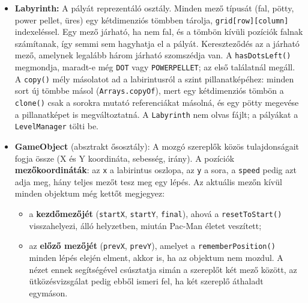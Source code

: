 \documentclass[11pt, a4paper]{article}
\begin{document}
\begin{itemize}
    \textbf{Mentés és betöltés:} A \texttt{saveGameState(file)} metódus fájlba írja ezt a motort, a \texttt{loadGameState(file)} metódus pedig \textbf{statikus gyártómetódus} (static factory): egy vadonatúj, a fájlból beolvasott \texttt{GameEngine}-t ad vissza, ahelyett hogy egy meglévőt töltene fel, mert a legtöbb adattag (\texttt{map}, \texttt{pacman}, \texttt{ghosts}, \texttt{random}, \ldots) \texttt{final}, és a létrehozás után nem kaphat új értéket. Ugyanez az elv, mint amikor a \texttt{LevelManager} \texttt{loadFromCSV} metódusa új \texttt{LevelData}-t ad vissza. Lásd: \ref{sec:io}.~fejezet.
    \item \textbf{Labyrinth:} A pályát reprezentáló osztály. Minden mező típusát (fal, pötty, power pellet, üres) egy kétdimenziós tömbben tárolja, \texttt{grid[row][column]} indexeléssel. Egy mező járható, ha nem fal, és a tömbön kívüli pozíciók falnak számítanak, így semmi sem hagyhatja el a pályát. Kereszteződés az a járható mező, amelynek legalább három járható szomszédja van. A \texttt{hasDotsLeft()} megmondja, maradt-e még \texttt{DOT} vagy \texttt{POWERPELLET}; az első találatnál megáll. A \texttt{copy()} mély másolatot ad a labirintusról a szint pillanatképéhez: minden sort új tömbbe másol (\texttt{Arrays.copyOf}), mert egy kétdimenziós tömbön a \texttt{clone()} csak a sorokra mutató referenciákat másolná, és egy pötty megevése a pillanatképet is megváltoztatná. A \texttt{Labyrinth} nem olvas fájlt; a pályákat a \texttt{LevelManager} tölti be.
    \item \textbf{GameObject} (absztrakt ősosztály): A mozgó szereplők közös tulajdonságait fogja össze (X és Y koordináta, sebesség, irány). A pozíciók \textbf{mezőkoordináták}: az \texttt{x} a labirintus oszlopa, az \texttt{y} a sora, a \texttt{speed} pedig azt adja meg, hány teljes mezőt tesz meg egy lépés. Az aktuális mezőn kívül minden objektum még kettőt megjegyez:
    \begin{itemize}
        \item a \textbf{kezdőmezőjét} (\texttt{startX}, \texttt{startY}, \texttt{final}), ahová a \texttt{resetToStart()} visszahelyezi, álló helyzetben, miután Pac-Man életet veszített;
        \item az \textbf{előző mezőjét} (\texttt{prevX}, \texttt{prevY}), amelyet a \texttt{rememberPosition()} minden lépés elején elment, akkor is, ha az objektum nem mozdul. A nézet ennek segítségével csúsztatja simán a szereplőt két mező között, az ütközésvizsgálat pedig ebből ismeri fel, ha két szereplő áthaladt egymáson.
    \end{itemize}

\end{itemize}
\end{document}
